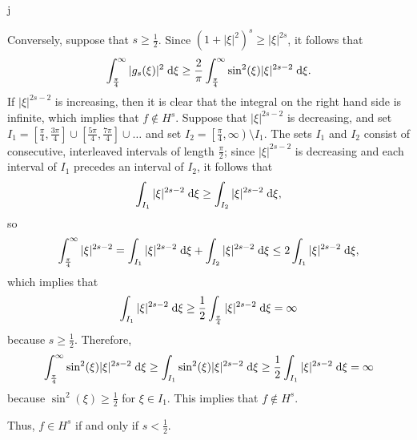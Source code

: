 j\documentclass{homework}
\begin{document}
	Conversely, suppose that $s \ge \frac{1}{2}$. Since $(1+|\xi|^2)^s \ge |\xi|^{2s}$, it follows that
	\begin{equation*}
		\int_\frac{\pi}{4}^\infty |g_s(\xi)|^2 \;\text{d}\xi \ge \frac{2}{\pi}\int_\frac{\pi}{4}^\infty \sin^2(\xi)|\xi|^{2s-2}\;\text{d} \xi.
	\end{equation*}
	If $|\xi|^{2s-2}$ is increasing, then it is clear that the integral on the right hand side is infinite, which implies that $f \notin H^s$. Suppose that $|\xi|^{2s-2}$ is decreasing, and set $I_1 = \left[\frac{\pi}{4}, \frac{3\pi}{4}\right] \cup \left[\frac{5\pi}{4}, \frac{7\pi}{4}\right] \cup \dots$ and set $I_2 = \left[\frac{\pi}{4}, \infty\right) \setminus I_1$. The sets $I_1$ and $I_2$ consist of consecutive, interleaved intervals of length $\frac{\pi}{2}$; since $|\xi|^{2s-2}$ is decreasing and each interval of $I_1$ precedes an interval of $I_2$, it follows that
	\begin{equation*}
		\int_{I_1} |\xi|^{2s-2}\;\text{d}\xi \ge \int_{I_2}|\xi|^{2s-2}\;\text{d}\xi,
	\end{equation*}
	so
	\begin{equation*}
		\int_\frac{\pi}{4}^\infty |\xi|^{2s-2} = \int_{I_1}|\xi|^{2s-2}\;\text{d}\xi + \int_{I_2}|\xi|^{2s-2}\;\text{d}\xi \le 2\int_{I_1} |\xi|^{2s-2}\;\text{d}\xi,
	\end{equation*}
	which implies that
	\begin{equation*}
		\int_{I_1}|\xi|^{2s-2}\;\text{d}\xi \ge \frac{1}{2}\int_{\frac{\pi}{4}} |\xi|^{2s-2}\;\text{d}\xi = \infty
	\end{equation*}
	because $s \ge \frac{1}{2}$. Therefore,
	\begin{equation*}
		\int_\frac{\pi}{4}^\infty \sin^2(\xi)|\xi|^{2s-2} \;\text{d}\xi \ge \int_{I_1}\sin^2(\xi)|\xi|^{2s-2}\;\text{d}\xi \ge \frac{1}{2}\int_{I_1}|\xi|^{2s-2}\;\text{d}\xi = \infty
	\end{equation*}
	because $\sin^2(\xi) \ge \frac{1}{2}$ for $\xi \in I_1$. This implies that $f \notin H^s$.
	
	Thus, $f\in H^s$ if and only if $s < \frac{1}{2}$.
		
	
	
\end{document}

